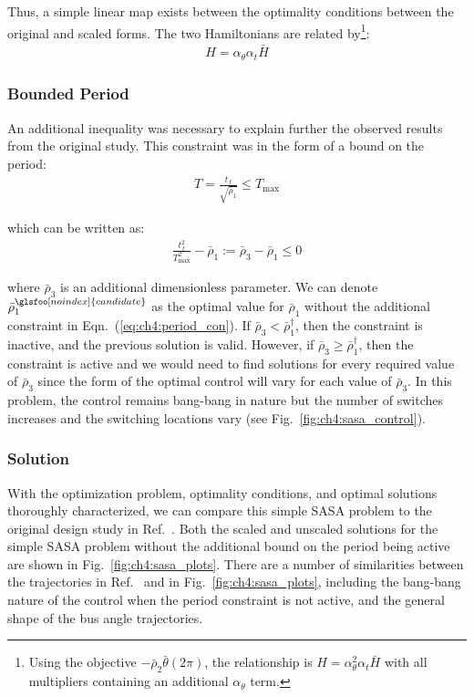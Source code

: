 \noindent Thus, a simple linear map exists between the optimality conditions between the original and scaled forms.
The two Hamiltonians are related by\footnote{Using the objective $-\bar{\rho}_2 \bar{\theta}(2\pi)$, the relationship is $H = \alpha_\theta^2 \alpha_t \bar{H}$ with all multipliers containing an additional $\alpha_\theta$ term.}:
\begin{align}
H = \alpha_\theta \alpha_t \bar{H}
\end{align}

\subsubsection{Bounded Period}

An additional inequality was necessary to explain further the observed results from the original study.
This constraint was in the form of a bound on the period:
\begin{align}
T = \frac{t_f}{\sqrt{\bar{\rho}_1}} \leq T_{\max}
\end{align}

\noindent which can be written as:
\begin{align}
\label{eq:ch4:period_con}
\frac{t_f^2}{T_{\max}^2} - \bar{\rho}_1 := \bar{\rho}_3 - \bar{\rho}_1 \leq 0
\end{align}

\noindent where $\bar{\rho}_3$ is an additional dimensionless parameter.
We can denote $\bar{\rho}_1^{\glsfoo[noindex]{candidate}}$ as the optimal value for $\bar{\rho}_1$ without the additional constraint in Eqn.~(\ref{eq:ch4:period_con}).
If $\bar{\rho}_3 < \bar{\rho}_1^\dagger$, then the constraint is inactive, and the previous solution is valid.
However, if $\bar{\rho}_3 \geq \bar{\rho}_1^\dagger$, then the constraint is active and we would need to find solutions for every required value of $\bar{\rho}_3$ since the form of the optimal control will vary for each value of $\bar{\rho}_3$.
In this problem, the control remains bang-bang in nature but the number of switches increases and the switching locations vary (see Fig.~\ref{fig:ch4:sasa_control}).

\subsubsection{Solution}



With the optimization problem, optimality conditions, and optimal solutions thoroughly characterized, we can compare this simple SASA problem to the original design study in Ref.~\cite{Chilan2017a}. Both the scaled and unscaled solutions for the simple SASA problem without the additional bound on the period being active are shown in Fig.~\ref{fig:ch4:sasa_plots}.
There are a number of similarities between the trajectories in Ref.~\cite{Chilan2017a} and in Fig.~\ref{fig:ch4:sasa_plots}, including the bang-bang nature of the control when the period constraint is not active, and the general shape of the bus angle trajectories.

